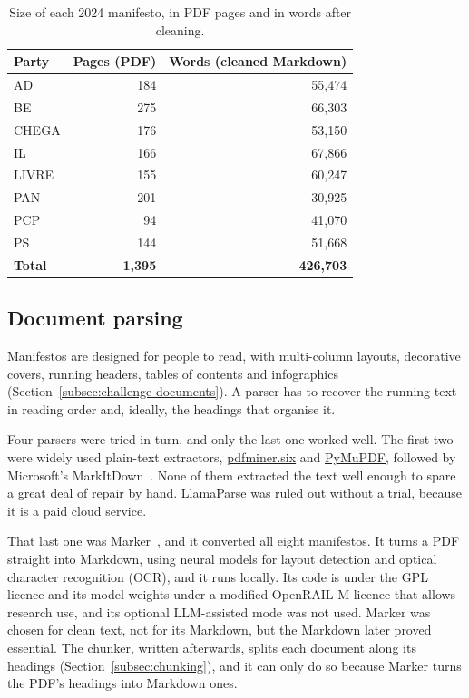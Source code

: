 \begin{table}[h]
    \centering
    \begin{tabular}{|l|r|r|}
        \hline
        \textbf{Party} & \textbf{Pages (PDF)} & \textbf{Words (cleaned Markdown)} \\
        \hline
        AD    & 184 & 55{,}474 \\
        BE    & 275 & 66{,}303 \\
        CHEGA & 176 & 53{,}150 \\
        IL    & 166 & 67{,}866 \\
        LIVRE & 155 & 60{,}247 \\
        PAN   & 201 & 30{,}925 \\
        PCP   &  94 & 41{,}070 \\
        PS    & 144 & 51{,}668 \\
        \hline
        \textbf{Total} & \textbf{1{,}395} & \textbf{426{,}703} \\
        \hline
    \end{tabular}
    \caption[The corpus]{Size of each 2024 manifesto, in PDF pages and in words
    after cleaning.}
    \label{tab:corpus}
\end{table}

\subsection{Document parsing} \label{subsec:parsing}

Manifestos are designed for people to read, with multi-column layouts,
decorative covers, running headers, tables of contents and infographics
(Section~\ref{subsec:challenge-documents}). A parser has to recover the
running text in reading order and, ideally, the headings that organise it.

Four parsers were tried in turn, and only the last one worked well. The first
two were widely used plain-text extractors,
\href{https://github.com/pdfminer/pdfminer.six}{pdfminer.six} and
\href{https://pymupdf.readthedocs.io/en/latest/}{PyMuPDF}, followed by
Microsoft's MarkItDown~\citep{markitdown}. None of them extracted the text
well enough to spare a great deal of repair by hand.
\href{https://docs.llamaindex.ai/en/stable/llama_cloud/llama_parse/}{LlamaParse}
was ruled out without a trial, because it is a paid cloud service.

That last one was Marker~\citep{marker}, and it converted all
eight manifestos. It turns a PDF straight into Markdown, using neural models
for layout detection and optical character recognition (OCR), and it runs
locally. Its
code is under the GPL licence and its model weights under a modified
OpenRAIL-M licence that allows research use, and its optional LLM-assisted
mode was not used. Marker was chosen for clean text, not for its Markdown, but
the Markdown later proved essential. The chunker, written afterwards, splits
each document along its headings (Section~\ref{subsec:chunking}), and it can
only do so because Marker turns the PDF's headings into Markdown ones.

